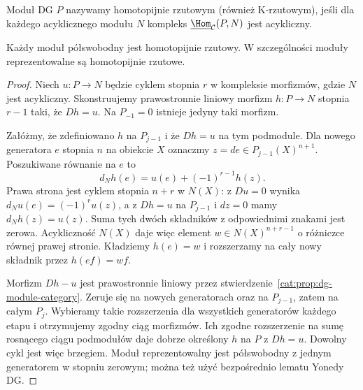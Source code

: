 \begin{definicja}\label{cat:def:dg-h-projective}
Moduł DG $P$ nazywamy homotopijnie rzutowym (również K-rzutowym), jeśli dla każdego acyklicznego modułu $N$ kompleks $\underline{\Hom}_{\mathcal C}(P,N)$ jest acykliczny.
\end{definicja}

\begin{twierdzenie}\label{cat:thm:dg-semifree-h-projective}
Każdy moduł półswobodny jest homotopijnie rzutowy. W szczególności moduły reprezentowalne są homotopijnie rzutowe.
\end{twierdzenie}
\begin{proof}
Niech $u:P\to N$ będzie cyklem stopnia $r$ w kompleksie morfizmów, gdzie $N$ jest acykliczny. Skonstruujemy prawostronnie liniowy morfizm $h:P\to N$ stopnia $r-1$ taki, że $Dh=u$. Na $P_{-1}=0$ istnieje jedyny taki morfizm.

Załóżmy, że zdefiniowano $h$ na $P_{j-1}$ i że $Dh=u$ na tym podmodule. Dla nowego generatora $e$ stopnia $n$ na obiekcie $X$ oznaczmy $z=de\in P_{j-1}(X)^{n+1}$. Poszukiwane równanie na $e$ to
\[
 d_Nh(e)=u(e)+(-1)^{r-1}h(z).
\]
Prawa strona jest cyklem stopnia $n+r$ w $N(X)$: z $Du=0$ wynika $d_Nu(e)=(-1)^ru(z)$, a z $Dh=u$ na $P_{j-1}$ i $dz=0$ mamy $d_Nh(z)=u(z)$. Suma tych dwóch składników z odpowiednimi znakami jest zerowa. Acykliczność $N(X)$ daje więc element $w\in N(X)^{n+r-1}$ o różniczce równej prawej stronie. Kładziemy $h(e)=w$ i rozszerzamy na cały nowy składnik przez $h(ef)=wf$.

Morfizm $Dh-u$ jest prawostronnie liniowy przez stwierdzenie~\ref{cat:prop:dg-module-category}. Zeruje się na nowych generatorach oraz na $P_{j-1}$, zatem na całym $P_j$. Wybieramy takie rozszerzenia dla wszystkich generatorów każdego etapu i otrzymujemy zgodny ciąg morfizmów. Ich zgodne rozszerzenie na sumę rosnącego ciągu podmodułów daje dobrze określony $h$ na $P$ z $Dh=u$. Dowolny cykl jest więc brzegiem. Moduł reprezentowalny jest półswobodny z jednym generatorem w stopniu zerowym; można też użyć bezpośrednio lematu Yonedy DG.
\end{proof}

